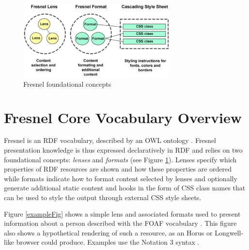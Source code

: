 \begin{figure}
\begin{center}
\includegraphics[width=8cm]{overview.pdf}
\caption{Fresnel foundational concepts}
\label{foundationalConceptsFig}
\end{center}
\end{figure}


\section{Fresnel Core Vocabulary Overview}
\label{fresnelov}

Fresnel is an RDF vocabulary, described by an OWL ontology \cite{fresnel05}. Fresnel presentation knowledge is thus expressed declaratively in RDF and relies on two foundational concepts: {\em lenses} and {\em formats} (see Figure \ref{foundationalConceptsFig}). Lenses specify which properties of RDF resources are shown and how these properties are ordered while formats indicate how to format content selected by lenses and optionally generate additional static content and hooks in the form of CSS class names that can be used to style the output through external CSS style sheets.

Figure \ref{exampleFig} shows a simple lens and associated formats used to present information about a person described with the FOAF vocabulary \cite{foaf}. This figure also shows a hypothetical rendering of such a resource, as an Horus \cite{horus} or Longwell-like browser could produce. Examples use the Notation 3 syntax \cite{N3}.

